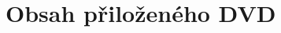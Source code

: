 \documentclass[thesis=B,czech]{FITthesis}[2013/05/06]
\begin{document}
%
%
%

\chapter{Obsah přiloženého DVD}

\end{document}
